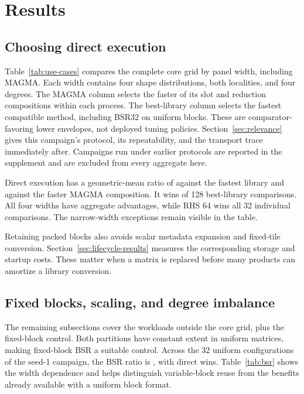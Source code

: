 \documentclass[10pt]{article}
\begin{document}
\section{Results}
\subsection{Choosing direct execution}
Table~\ref{tab:use-cases} compares the complete core grid by panel width,
including MAGMA. Each width contains four shape distributions, both
localities, and four degrees. The MAGMA column selects the faster of its
slot and reduction compositions within each process. The best-library
column selects the fastest compatible method, including BSR32 on uniform
blocks. These are comparator-favoring lower envelopes, not deployed tuning
policies. Section~\ref{sec:relevance} gives this campaign's protocol, its
repeatability, and the transport trace immediately after. Campaigns run under
earlier protocols are reported in the supplement and are excluded from every
aggregate here.

\begin{table}[!htbp]
\centering\small
\caption{Choosing an implementation on the 4,096-block-row core, matrix
seeds 2, 3, and 5. Ratios divide comparator time by direct time and average
in log space over three processes per seed. Each process uses twenty samples
per method and single-product synchronization.}
\label{tab:use-cases}

\end{table}

Direct execution has a geometric-mean ratio of \RelevanceCoreRatio{}
against the fastest library and \RelevanceMagmaRatio{} against the faster
MAGMA composition. It wins \RelevanceCoreWins{} of 128 best-library
comparisons. All four widths have aggregate advantages, while RHS 64 wins
all 32 individual comparisons. The narrow-width exceptions remain visible
in the table.

Retaining packed blocks also avoids scalar metadata expansion and fixed-tile
conversion. Section~\ref{sec:lifecycle-results} measures the corresponding
storage and startup costs. These matter when a matrix is replaced before
many products can amortize a library conversion.




\subsection{Fixed blocks, scaling, and degree imbalance}
The remaining subsections cover the workloads outside the core grid, plus
the fixed-block control. Both partitions have constant extent in uniform
matrices, making fixed-block
BSR a suitable control. Across the 32 uniform configurations of the
seed-1 campaign, the BSR ratio is
\AuditBsr{}, with \AuditBsrWins{} direct wins. Table~\ref{tab:bsr} shows the
width dependence and helps distinguish variable-block reuse from the
benefits already available with a uniform block format.
\end{document}
